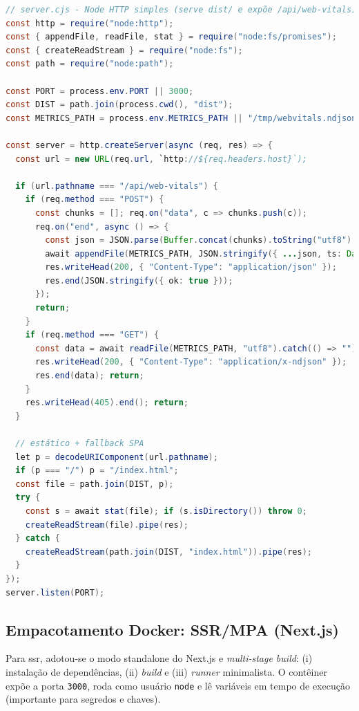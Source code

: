 \begin{lstlisting}[language=Java,caption={Servidor estático + endpoint (CSR/React+Vite)}]
// server.cjs - Node HTTP simples (serve dist/ e expõe /api/web-vitals)
const http = require("node:http");
const { appendFile, readFile, stat } = require("node:fs/promises");
const { createReadStream } = require("node:fs");
const path = require("node:path");

const PORT = process.env.PORT || 3000;
const DIST = path.join(process.cwd(), "dist");
const METRICS_PATH = process.env.METRICS_PATH || "/tmp/webvitals.ndjson";

const server = http.createServer(async (req, res) => {
  const url = new URL(req.url, `http://${req.headers.host}`);

  if (url.pathname === "/api/web-vitals") {
    if (req.method === "POST") {
      const chunks = []; req.on("data", c => chunks.push(c));
      req.on("end", async () => {
        const json = JSON.parse(Buffer.concat(chunks).toString("utf8") || "{}");
        await appendFile(METRICS_PATH, JSON.stringify({ ...json, ts: Date.now() }) + "\n", "utf8");
        res.writeHead(200, { "Content-Type": "application/json" });
        res.end(JSON.stringify({ ok: true }));
      });
      return;
    }
    if (req.method === "GET") {
      const data = await readFile(METRICS_PATH, "utf8").catch(() => "");
      res.writeHead(200, { "Content-Type": "application/x-ndjson" });
      res.end(data); return;
    }
    res.writeHead(405).end(); return;
  }

  // estático + fallback SPA
  let p = decodeURIComponent(url.pathname);
  if (p === "/") p = "/index.html";
  const file = path.join(DIST, p);
  try {
    const s = await stat(file); if (s.isDirectory()) throw 0;
    createReadStream(file).pipe(res);
  } catch {
    createReadStream(path.join(DIST, "index.html")).pipe(res);
  }
});
server.listen(PORT);
\end{lstlisting}

\subsection{Empacotamento Docker: SSR/MPA (Next.js)}
\label{ssec:ssr-docker}

Para \acrshort{ssr}, adotou-se o modo standalone do Next.js e \textit{multi-stage build}: (i) instalação de dependências, (ii) \textit{build} e (iii) \textit{runner} minimalista. O contêiner expõe a porta \texttt{3000}, roda como usuário \texttt{node} e lê variáveis em tempo de execução (importante para segredos e chaves).

